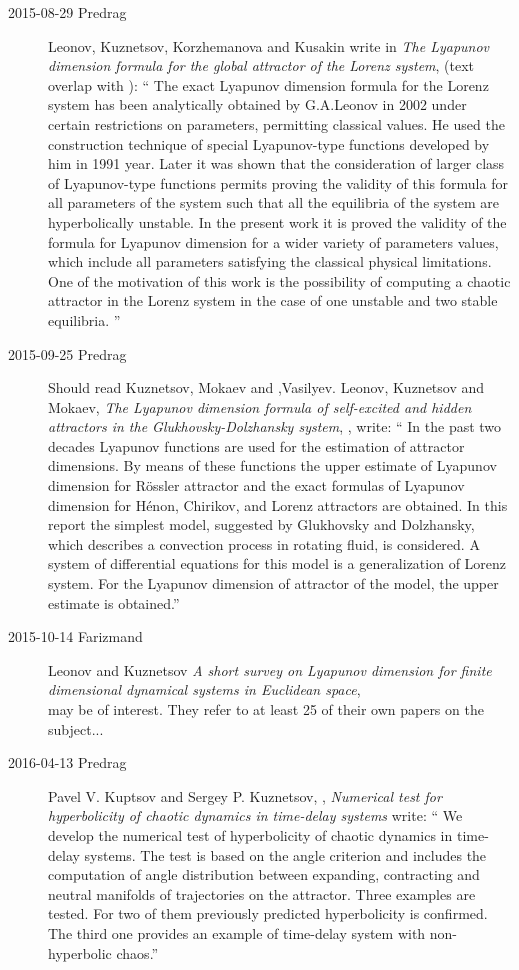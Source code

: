 \begin{description}
\item[2015-08-29 Predrag]
Leonov, Kuznetsov, Korzhemanova and Kusakin write in {\em The Lyapunov
dimension formula for the global attractor of the Lorenz system},
 (text overlap with ):
``
  The exact Lyapunov dimension formula for the Lorenz system has been
analytically obtained by G.A.Leonov in 2002 under certain
restrictions on parameters, permitting classical values. He used the
construction technique of special Lyapunov-type functions developed by
him in 1991 year. Later it was shown that the consideration of larger
class of Lyapunov-type functions permits proving the validity of this
formula for all parameters of the system such that all the equilibria
of the system are hyperbolically unstable. In the present work it is
proved the validity of the formula for Lyapunov dimension for a wider
variety of parameters values, which include all parameters satisfying
the classical physical limitations. One of the motivation of this work
is the possibility of computing a chaotic attractor in the Lorenz
system in the case of one unstable and two stable equilibria.
''

\item[2015-09-25 Predrag]
Should read Kuznetsov, Mokaev and ,Vasilyev.
Leonov, Kuznetsov and Mokaev, \emph{The Lyapunov dimension formula of
self-excited and hidden attractors in the Glukhovsky-Dolzhansky system},
, write: ``
  In the past two decades Lyapunov functions are used for the estimation of
attractor dimensions. By means of these functions the upper estimate of
Lyapunov dimension for R\"{o}ssler attractor and the exact formulas of Lyapunov
dimension for H\'{e}non, Chirikov, and Lorenz attractors are obtained.
  In this report the simplest model, suggested by Glukhovsky and Dolzhansky,
which describes a convection process in rotating fluid, is considered. A system
of differential equations for this model is a generalization of Lorenz system.
For the Lyapunov dimension of attractor of the model, the upper estimate is
obtained.''

\item[2015-10-14 Farizmand]
Leonov and Kuznetsov {\em A short survey on {Lyapunov}
dimension for finite dimensional dynamical systems in {Euclidean} space},
\\
 may be of  interest. They refer to at least 25 of their own
papers on the subject...

\item[2016-04-13 Predrag]
Pavel V. Kuptsov and Sergey P. Kuznetsov,
,
{\em Numerical test for hyperbolicity of chaotic dynamics in time-delay
  systems}
write: ``
  We develop the numerical test of hyperbolicity of chaotic dynamics in
time-delay systems. The test is based on the angle criterion and includes the
computation of angle distribution between expanding, contracting and neutral
manifolds of trajectories on the attractor. Three examples are tested. For two
of them previously predicted hyperbolicity is confirmed. The third one provides
an example of time-delay system with non-hyperbolic chaos.''


\end{description}
